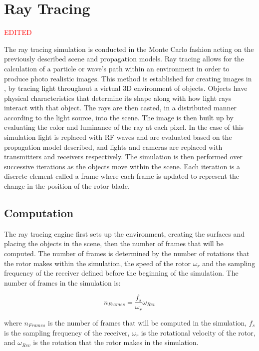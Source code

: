 \section{Ray Tracing}
\textcolor{red}{EDITED}

The ray tracing simulation is conducted in the Monte Carlo fashion acting on the previously described scene and propagation models. Ray tracing allows for the calculation of a particle or wave's path within an environment in order to produce photo realistic images. This method is established for creating images in \cite{Suffern2007}, \cite{Pharr2010} by tracing light throughout a virtual 3D environment of objects. Objects have physical characteristics that determine its shape along with how light rays interact with that object. The rays are then casted, in a distributed manner according to the light source, into the scene. The image is then built up by evaluating the color and luminance of the ray at each pixel. In the case of this simulation light is replaced with RF waves and are evaluated based on the propagation model described, and lights and cameras are replaced with transmitters and receivers respectively. The simulation is then performed over successive iterations as the objects move within the scene. Each iteration is a discrete element called a frame where each frame is updated to represent the change in the position of the rotor blade.

\subsection{Computation}
The ray tracing engine first sets up the environment, creating the surfaces and placing the objects in the scene, then the number of frames that will be computed. The number of frames is determined by the number of rotations that the rotor makes within the simulation, the speed of the rotor $\omega_r$ and the sampling frequency of the receiver defined before the beginning of the simulation. The number of frames in the simulation is:

\begin{equation}
	n_{Frames} = \frac{f_s}{\omega_r}\omega_{Rev}
	\label{eqn:frames}
\end{equation}

where $n_{Frames}$ is the number of frames that will be computed in the simulation, $f_s$ is the sampling frequency of the receiver, $\omega_r$ is the rotational velocity of the rotor, and $\omega_{Rev}$ is the rotation that the rotor makes in the simulation.

